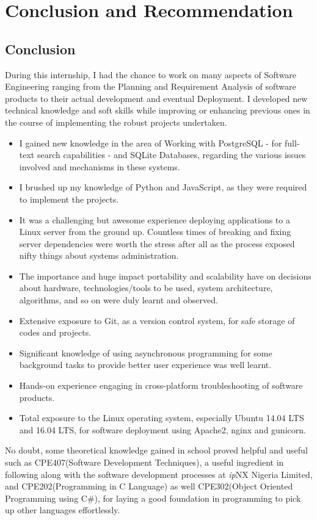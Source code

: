 \chapter{Conclusion and Recommendation}
\section{Conclusion}
During this internship, I had the chance to work on many aspects of Software Engineering ranging from the Planning and Requirement Analysis of software products to their actual development and eventual Deployment. I developed new technical knowledge and soft skills while improving or enhancing previous ones in the course of implementing the robust projects undertaken.
\begin{itemize}
	\item I gained new knowledge in the area of Working with PostgreSQL - for full-text search capabilities - and SQLite Databases, regarding the various issues involved and mechanisms in these systems.
	\item I brushed up my knowledge of Python and JavaScript, as they were required to implement the projects.
	\item It was a challenging but awesome experience deploying applications to a Linux server from the ground up. Countless times of breaking and fixing server dependencies were worth the stress after all as the process exposed nifty things about systems administration.
	\item The importance and huge impact portability and scalability have on decisions about hardware, technologies/tools to be used, system architecture, algorithms, and so on were duly learnt and observed.
	\item Extensive exposure to Git, as a version control system, for safe storage of codes and projects.
	\item Significant knowledge of using asynchronous programming for some background tasks to provide better user experience was well learnt.
	\item Hands-on experience engaging in cross-platform troubleshooting of software products.
	\item Total exposure to the Linux operating system, especially Ubuntu 14.04 LTS and 16.04 LTS, for software deployment using Apache2, nginx and gunicorn. 
\end{itemize}
No doubt, some theoretical knowledge gained in school proved helpful and useful such as CPE407(Software Development Techniques), a useful ingredient in following along with the software development processes at \textit{ip}NX Nigeria Limited, and CPE202(Programming in C Language) as well CPE302(Object Oriented Programming using C\#), for laying a good foundation in programming to pick up other languages effortlessly.
